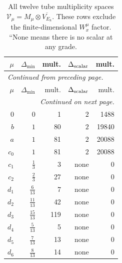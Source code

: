 \begingroup\small
\setlength{\tabcolsep}{5pt}
\begin{longtable}{rrrrr}
\caption{All twelve tube multiplicity spaces $\mathcal V_\mu=M_\mu\otimes\overline{V_{E_8}}$. These rows exclude the finite-dimensional $W_x^\mu$ factor. ``None means there is no scalar at any grade.}\label{expphysics:tube-spaces}\\
\toprule
$\mu$ & $\Delta_{\min}$ & mult. & $\Delta_{\rm scalar}$ & mult.\\
\midrule
\endfirsthead
\multicolumn{5}{l}{\small\itshape Continued from preceding page.}\\
\toprule
$\mu$ & $\Delta_{\min}$ & mult. & $\Delta_{\rm scalar}$ & mult.\\
\midrule
\endhead
\midrule
\multicolumn{5}{r}{\small\itshape Continued on next page.}\\
\endfoot
\bottomrule
\endlastfoot
$0$ & $0$ & 1 & $2$ & 1488\\
$b$ & $1$ & 80 & $2$ & 19840\\
$a$ & $1$ & 81 & $2$ & 20088\\
$c_{0}$ & $1$ & 81 & $2$ & 20088\\
$c_{1}$ & $\frac{1}{3}$ & 3 & none & 0\\
$c_{2}$ & $\frac{2}{3}$ & 27 & none & 0\\
$d_{1}$ & $\frac{6}{13}$ & 7 & none & 0\\
$d_{2}$ & $\frac{11}{13}$ & 42 & none & 0\\
$d_{3}$ & $\frac{15}{13}$ & 119 & none & 0\\
$d_{4}$ & $\frac{5}{13}$ & 5 & none & 0\\
$d_{5}$ & $\frac{7}{13}$ & 13 & none & 0\\
$d_{6}$ & $\frac{8}{13}$ & 14 & none & 0\\
\end{longtable}
\endgroup
